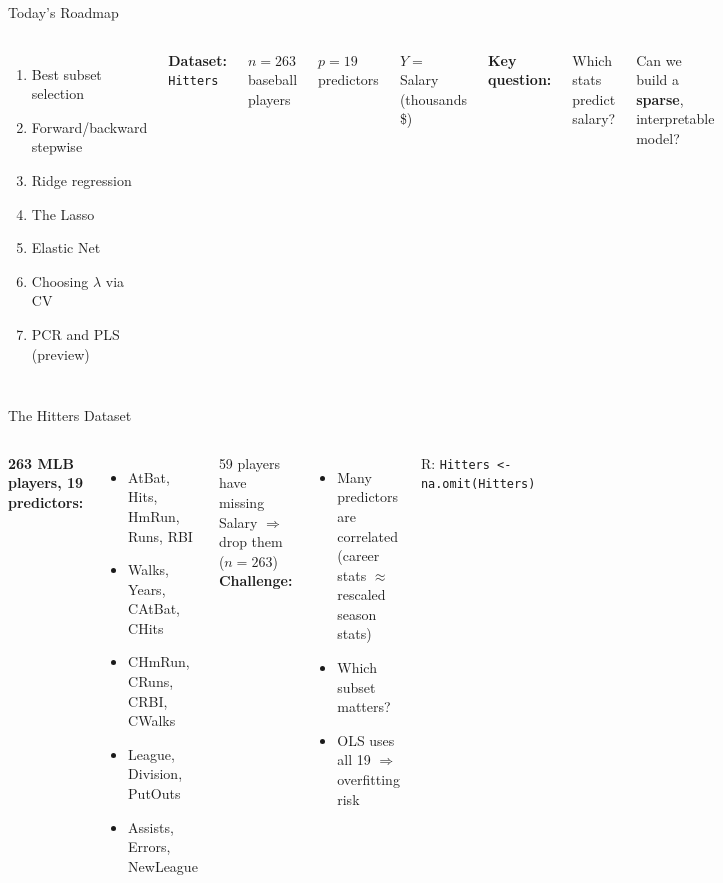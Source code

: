 \documentclass[aspectratio=169, 11pt]{beamer}
\begin{document}
\begin{frame}{Today's Roadmap}
\begin{columns}
\begin{enumerate}
  \item Best subset selection
  \item Forward/backward stepwise
  \item Ridge regression
  \item The Lasso
  \item Elastic Net
  \item Choosing $\lambda$ via CV
  \item PCR and PLS (preview)
\end{enumerate}
\textbf{Dataset:} \texttt{Hitters}

$n = 263$ baseball players

$p = 19$ predictors

$Y =$ Salary (thousands \$)

\vspace{0.5em}
\textbf{Key question:}

Which stats predict salary?

Can we build a \textbf{sparse}, interpretable model?
\end{columns}
\end{frame}

\begin{frame}{The Hitters Dataset}
\begin{columns}
\textbf{263 MLB players, 19 predictors:}
\begin{itemize}
  \item AtBat, Hits, HmRun, Runs, RBI
  \item Walks, Years, CAtBat, CHits
  \item CHmRun, CRuns, CRBI, CWalks
  \item League, Division, PutOuts
  \item Assists, Errors, NewLeague
\end{itemize}
\vspace{0.3em}
59 players have missing Salary $\Rightarrow$ drop them ($n = 263$)
\textbf{Challenge:}
\begin{itemize}
  \item Many predictors are correlated (career stats $\approx$ rescaled season stats)
  \item Which subset matters?
  \item OLS uses all 19 $\Rightarrow$ overfitting risk
\end{itemize}
\vspace{0.3em}
\footnotesize R: \texttt{Hitters <- na.omit(Hitters)}
\end{columns}
\end{frame}
\end{document}

